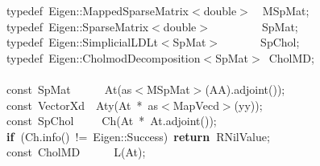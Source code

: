 \documentclass[shortnames,article]{jss}
\newcommand{\hlstd}[1]{\textcolor[rgb]{0,0,0}{#1}}
\newcommand{\hlopt}[1]{\textcolor[rgb]{0,0,0}{#1}}
\newcommand{\hlkwa}[1]{\textcolor[rgb]{0.61,0.13,0.93}{\bf{#1}}}
\newcommand{\hlkwb}[1]{\textcolor[rgb]{0.13,0.54,0.13}{#1}}
\newcommand{\hlkwc}[1]{\textcolor[rgb]{0,0,1}{#1}}
\newcommand{\hlkwd}[1]{\textcolor[rgb]{0,0,0}{#1}}
\begin{document}
\begin{figure}[htb]
    \noindent
    \ttfamily
    \hlstd{}\hlkwc{typedef\ }\hlstd{Eigen}\hlopt{::}\hlstd{MappedSparseMatrix}\hlopt{$<$}\hlstd{}\hlkwb{double}\hlstd{}\hlopt{$>$}\hlstd{\ \ }\hlopt{}\hlstd{MSpMat}\hlopt{;}\hspace*{\fill}\\
    \hlstd{}\hlkwc{typedef\ }\hlstd{Eigen}\hlopt{::}\hlstd{SparseMatrix}\hlopt{$<$}\hlstd{}\hlkwb{double}\hlstd{}\hlopt{$>$}\hlstd{\ \ \ \ \ \ \ \ \ }\hlopt{}\hlstd{SpMat}\hlopt{;}\hspace*{\fill}\\
    \hlstd{}\hlkwc{typedef\ }\hlstd{Eigen}\hlopt{::}\hlstd{SimplicialLDLt}\hlopt{$<$}\hlstd{SpMat}\hlopt{$>$}\hlstd{\ \ \ \ \ \ \ }\hlopt{}\hlstd{SpChol}\hlopt{;}\hspace*{\fill}\\
    \hlstd{}\hlkwc{typedef\ }\hlstd{Eigen}\hlopt{::}\hlstd{CholmodDecomposition}\hlopt{$<$}\hlstd{SpMat}\hlopt{$>$\ }\hlstd{CholMD}\hlopt{;}\hspace*{\fill}\\
    \hlstd{}\hspace*{\fill}\\
    \hlkwb{const\ }\hlstd{SpMat}\hlstd{\ \ \ \ \ \ }\hlstd{}\hlkwd{At}\hlstd{}\hlopt{(}\hlstd{as}\hlopt{$<$}\hlstd{MSpMat}\hlopt{$>$(}\hlstd{AA}\hlopt{).}\hlstd{}\hlkwd{adjoint}\hlstd{}\hlopt{());}\hspace*{\fill}\\
    \hlstd{}\hlkwb{const\ }\hlstd{VectorXd}\hlstd{\ \ }\hlstd{}\hlkwd{Aty}\hlstd{}\hlopt{(}\hlstd{At\ }\hlopt{{*}\ }\hlstd{as}\hlopt{$<$}\hlstd{MapVecd}\hlopt{$>$(}\hlstd{yy}\hlopt{));}\hspace*{\fill}\\
    \hlstd{}\hlkwb{const\ }\hlstd{SpChol}\hlstd{\ \ \ \ \ }\hlstd{}\hlkwd{Ch}\hlstd{}\hlopt{(}\hlstd{At\ }\hlopt{{*}\ }\hlstd{At}\hlopt{.}\hlstd{}\hlkwd{adjoint}\hlstd{}\hlopt{());}\hspace*{\fill}\\
    \hlstd{}\hlkwa{if\ }\hlstd{}\hlopt{(}\hlstd{Ch}\hlopt{.}\hlstd{}\hlkwd{info}\hlstd{}\hlopt{()\ !=\ }\hlstd{Eigen}\hlopt{::}\hlstd{Success}\hlopt{)\ }\hlstd{}\hlkwa{return\ }\hlstd{R\textunderscore NilValue}\hlopt{;}\hspace*{\fill}\\
    \hlstd{}\hlkwb{const\ }\hlstd{CholMD}\hlstd{\ \ \ \ \ \ }\hlstd{}\hlkwd{L}\hlstd{}\hlopt{(}\hlstd{At}\hlopt{);}\hspace*{\fill}\\

\end{figure}
\end{document}
